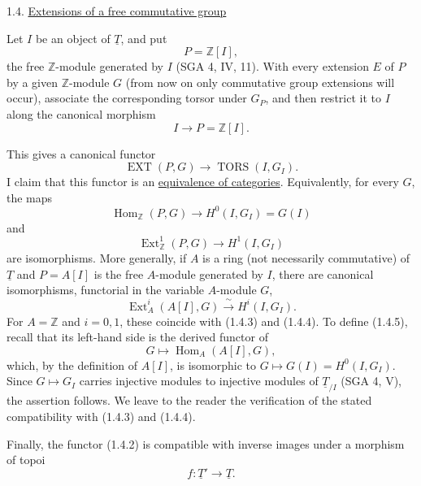 
1.4. \underline{Extensions of a free commutative group}

Let $I$ be an object of $\underline T$, and put
\begin{equation}\tag{1.4.1}
 P=\mathbb Z[I],
\end{equation}
the free $\mathbb Z$-module generated by $I$ (SGA 4, IV, 11). With
every extension $E$ of $P$ by a given $\mathbb Z$-module $G$ (from now
on only commutative group extensions will occur), associate the
corresponding torsor under $G_P$, and then restrict it to $I$ along the
canonical morphism
\[
 I\longrightarrow P=\mathbb Z[I].
\]


This gives a canonical functor
\begin{equation}\tag{1.4.2}
 \operatorname{EXT}(P,G)\longrightarrow
 \operatorname{TORS}(I,G_I).
\end{equation}
I claim that this functor is an \underline{equivalence of categories}.
Equivalently, for every $G$, the maps
\begin{equation}\tag{1.4.3}
 \operatorname{Hom}_{\mathbb Z}(P,G)\longrightarrow
 H^0(I,G_I)=G(I)
\end{equation}
and
\begin{equation}\tag{1.4.4}
 \operatorname{Ext}^1_{\mathbb Z}(P,G)\longrightarrow H^1(I,G_I)
\end{equation}
are isomorphisms. More generally, if $A$ is a ring (not necessarily
commutative) of $\underline T$ and $P=A[I]$ is the free $A$-module
generated by $I$, there are canonical isomorphisms, functorial in the
variable $A$-module $G$,
\begin{equation}\tag{1.4.5}
 \operatorname{Ext}^i_A(A[I],G)\xrightarrow{\ \sim\ }H^i(I,G_I).
\end{equation}
For $A=\mathbb Z$ and $i=0,1$, these coincide with (1.4.3) and
(1.4.4). To define (1.4.5), recall that its left-hand side is the
derived functor of
\[
 G\longmapsto\operatorname{Hom}_A(A[I],G),
\]
which, by the definition of $A[I]$, is isomorphic to
$G\longmapsto G(I)=H^0(I,G_I)$. Since $G\longmapsto G_I$ carries
injective modules to injective modules of $\underline T_{/I}$ (SGA 4,
V), the assertion follows. We leave to the reader the verification of
the stated compatibility with (1.4.3) and (1.4.4).

Finally, the functor (1.4.2) is compatible with inverse images under a
morphism of topoi
\[
 f:\underline T'\longrightarrow\underline T.
\]

